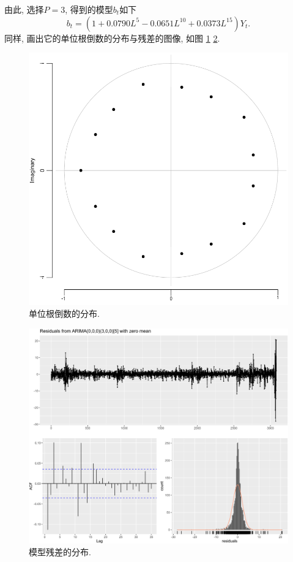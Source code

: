 \documentclass[12pt]{article}
\begin{document}
由此, 选择$P=3$, 得到的模型$b_t$如下
\[
    b_t=(1+0.0790L^5-0.0651L^{10}+0.0373L^{15})Y_t.  
\]
同样, 画出它的单位根倒数的分布与残差的图像, 如图 \ref{fig:8} \ref{fig:9}.
\begin{center}
    \begin{minipage}{0.45\textwidth}
        \begin{figure}
            \centering
            \hspace{-30pt}\includegraphics[width=.95\textwidth]{m2}
            \caption{单位根倒数的分布.\label{fig:8}}
        \end{figure}
    \end{minipage}
    \begin{minipage}{0.45\textwidth}
        \begin{figure}
            \centering
            \hspace{-25pt}\includegraphics[width=.95\textwidth]{m21}
            \caption{模型残差的分布.\label{fig:9}}
        \end{figure}
    \end{minipage}
\end{center}
    
\end{document}
